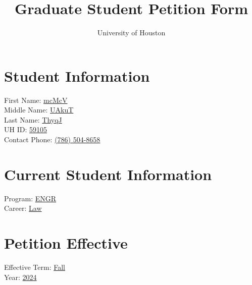 \documentclass[a4paper,12pt]{article}
\title{Graduate Student Petition Form}
\author{University of Houston}
\date{}
\begin{document}
    
    \maketitle
    
    \section*{Student Information}
    \begin{tabbing}
    First Name: \hspace{3cm} \= \underline{\hspace{5cm} mcMcV} \\
    Middle Name: \> \underline{\hspace{5cm} UAkuT} \\
    Last Name: \> \underline{\hspace{5cm} ThyqJ} \\
    UH ID: \> \underline{\hspace{5cm} 59105} \\
    Contact Phone: \> \underline{\hspace{5cm} (786) 504-8658} \\
    \end{tabbing}
    
    \section*{Current Student Information}
    \begin{tabbing}
    Program: \hspace{3cm} \= \underline{\hspace{5cm} ENGR} \\
    Career: \> \underline{\hspace{5cm} Law} \\
    \end{tabbing}
    
    \section*{Petition Effective}
    \begin{tabbing}
    Effective Term: \hspace{2cm} \= \underline{\hspace{5cm} Fall} \\
    Year: \> \underline{\hspace{5cm} 2024} \\
    \end{tabbing}
    
\end{document}
